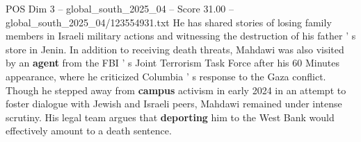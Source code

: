 \begin{textsample}{POS Dim 3 – global\_south\_2025\_04 – Score 31.00 – global\_south\_2025\_04/123554931.txt}
He has shared stories of losing family members in Israeli military actions and witnessing the destruction of his father ' s store in Jenin.
In addition to receiving death threats, Mahdawi was also visited by an \textbf{agent} from the FBI ' s Joint Terrorism Task Force after his 60 Minutes appearance, where he criticized Columbia ' s response to the Gaza conflict.
Though he stepped away from \textbf{campus} activism in early 2024 in an attempt to foster dialogue with Jewish and Israeli peers, Mahdawi remained under intense scrutiny.
His legal team argues that \textbf{deporting} him to the West Bank would effectively amount to a death sentence.

\end{textsample}
